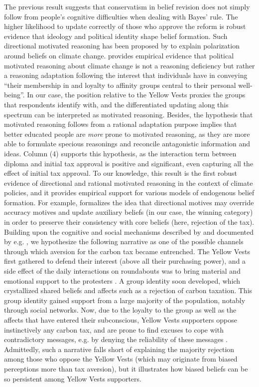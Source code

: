 \documentclass[12pt]{article} %
\begin{document}
The previous result suggests that conservatism in belief revision does not simply follow from people's cognitive difficulties when dealing with Bayes' rule. The higher likelihood to update correctly of those who approve the reform is robust evidence that ideology and political identity shape belief formation. Such directional motivated reasoning has been proposed by \citet{druckman_evidence_2019} to explain polarization around beliefs on climate change. \citet{kahan_ideology_2013} provides empirical evidence that political motivated reasoning about climate change is not a reasoning deficiency but rather a reasoning adaptation following the interest that individuals have in conveying ``their membership in and loyalty to affinity groups central to their personal well-being''. In our case, the position relative to the Yellow Vests proxies the groups that respondents identify with, and the differentiated updating along this spectrum can be interpreted as motivated reasoning. Besides, the hypothesis that motivated reasoning follows from a rational adaptation purpose implies that better educated people are \textit{more} prone to motivated reasoning, as they are more able to formulate specious reasonings and reconcile antagonistic information and ideas. Column (4) supports this hypothesis, as the interaction term between diploma and initial tax approval is positive and significant, even capturing all the effect of initial tax approval. To our knowledge, this result is the first robust evidence of directional and rational motivated reasoning in the context of climate policies, and it provides empirical support for various models of endogenous belief formation. For example, \citet{little_distortion_2019} formalizes the idea that directional motives may override accuracy motives and update auxiliary beliefs (in our case, the winning category) in order to preserve their consistency with core beliefs (here, rejection of the tax). Building upon the cognitive and social mechanisms described by \citet{kraft_why_2015} and documented by e.g. \citet{redlawsk_hot_2002}, we hypothesize the following narrative as one of the possible channels through which aversion for the carbon tax became entrenched. The Yellow Vests first gathered to defend their interest (above all their purchasing power), and a side effect of the daily interactions on roundabouts was to bring material and emotional support to the protesters \citep{challier_rencontres_2019}. A group identity soon developed, which crystallized shared beliefs and affects such as a rejection of carbon taxation. This group identity gained support from a large majority of the population, notably through social networks. Now, due to the loyalty to the group as well as the affects that have entered their subconscious, Yellow Vests supporters oppose instinctively any carbon tax, and are prone to find excuses to cope with contradictory messages, e.g. by denying the reliability of these messages \citep{golman_preference_2016}. Admittedly, such a narrative falls short of explaining the majority rejection among those who oppose the Yellow Vests (which may originate from biased perceptions more than tax aversion), but it illustrates how biased beliefs can be so persistent among Yellow Vests supporters.
\end{document}
